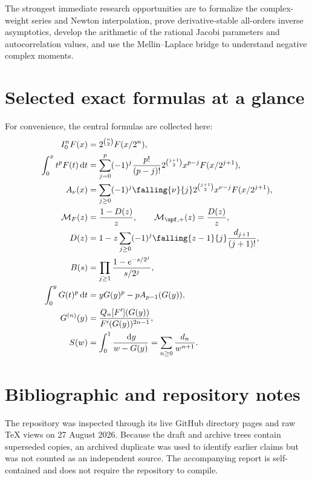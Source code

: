 \documentclass[11pt,oneside]{article}
\theoremstyle{definition}
\theoremstyle{remark}
\newcommand{\dd}{\,\mathrm d}
\newcommand{\1}{\mathbf 1}
\begin{document}
The strongest immediate research opportunities are to formalize the complex-weight series and Newton interpolation, prove derivative-stable all-orders inverse asymptotics, develop the arithmetic of the rational Jacobi parameters and autocorrelation values, and use the Mellin--Laplace bridge to understand negative complex moments.

\appendix

\section{Selected exact formulas at a glance}

For convenience, the central formulas are collected here:
\begin{align*}
 I_0^nF(x)&=2^{\binom n2}F(x/2^n),\\
 \int_0^xt^pF(t)\dd t
 &=\sum_{j=0}^{p}(-1)^j\frac{p!}{(p-j)!}
 2^{\binom{j+1}{2}}x^{p-j}F(x/2^{j+1}),\\
 A_\nu(x)
 &=\sum_{j\ge0}(-1)^j\falling{\nu}{j}
 2^{\binom{j+1}{2}}x^{\nu-j}F(x/2^{j+1}),\\
 \mathcal M_F(z)&=\frac{1-D(z)}z,
 \qquad \mathcal M_{\upf,+}(z)=\frac{D(z)}z,\\
 D(z)&=1-z\sum_{j\ge0}(-1)^j\falling{z-1}{j}
 \frac{d_{j+1}}{(j+1)!},\\
 B(s)&=\prod_{j\ge1}\frac{1-e^{-s/2^j}}{s/2^j},\\
 \int_0^yG(t)^p\dd t&=yG(y)^p-pA_{p-1}(G(y)),\\
 G^{(n)}(y)&=\frac{Q_n[F'](G(y))}{F'(G(y))^{2n-1}},\\
 S(w)&=\int_0^1\frac{\dd y}{w-G(y)}
 =\sum_{n\ge0}\frac{d_n}{w^{n+1}}.
\end{align*}

\section{Bibliographic and repository notes}

The repository was inspected through its live GitHub directory pages and raw TeX views on 27 August 2026.  Because the draft and archive trees contain superseded copies, an archived duplicate was used to identify earlier claims but was not counted as an independent source.  The accompanying report is self-contained and does not require the repository to compile.
\end{document}
